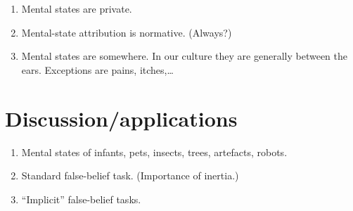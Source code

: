 \documentclass[12pt,a4paper]{article}
\newcommand{\Q}[1]{``#1''}
\begin{document}
\begin{enumerate}[label=P$_{\!\arabic*}$]
\item \label{p:privacy} Mental states are private.

\item \label{p:normativity} Mental-state attribution is normative. (Always?)

\item \label{p:location} Mental states are somewhere. In our culture they are generally between the ears. Exceptions are pains, itches,\ldots

\end{enumerate}

\section{Discussion/applications}
\begin{enumerate}\itemsep=0ex

\item Mental states of infants, pets, insects, trees, artefacts, robots.

\item Standard false-belief task. (Importance of inertia.)

\item \Q{Implicit} false-belief tasks.

\end{enumerate}
%


\end{document}
